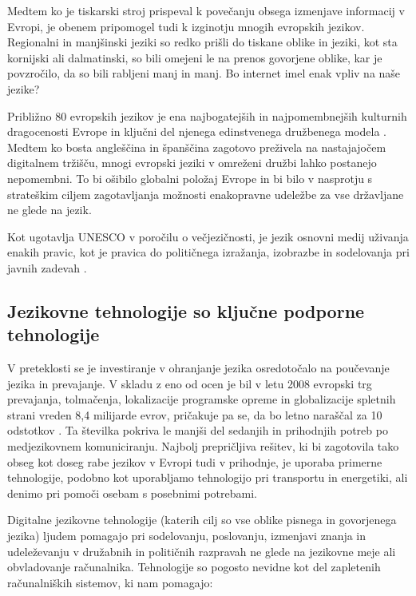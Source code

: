 \begin{multicols}{2}
Medtem ko je tiskarski stroj prispeval k povečanju obsega izmenjave informacij v Evropi, je obenem pripomogel tudi k izginotju mnogih evropskih jezikov. Regionalni in manjšinski jeziki so redko prišli do tiskane oblike in jeziki, kot sta kornijski ali dalmatinski, so bili omejeni le na prenos go\-vorjene oblike, kar je povzročilo, da so bili rab\-ljeni manj in manj. Bo internet imel enak vpliv na naše jezike?


Približno 80 evropskih jezikov je ena naj\-bogatejših in naj\-pomembnejših kulturnih dragocenosti Evrope in ključni del njenega edinstvenega družbenega modela \cite{EC2}.  Medtem ko bosta angleščina in španščina zagotovo preživela na nastajajočem digi\-talnem tržišču, mnogi evropski jeziki v omreženi družbi lahko postanejo nepomembni. To bi ošibilo globalni položaj Evrope in bi bilo v nasprotju s strateškim ciljem zagotav\-ljanja možnosti enakopravne udeležbe za vse držav\-ljane ne glede na jezik.

 Kot ugotav\-lja UNESCO v poročilu o večjezičnosti, je jezik osnovni medij uživanja enakih pravic, kot je pravica do političnega izražanja, izobrazbe in sodelovanja pri javnih zadevah \cite{Unesco1}.

\subsection{Jezikovne tehnologije so ključne podporne tehnologije}

 V preteklosti se je investiranje v ohranjanje jezika osredotočalo na poučevanje jezika in prevajanje. V skladu z eno od ocen je bil v letu 2008 evropski trg prevajanja, tolmačenja, lokalizacije programske opreme in globalizacije spletnih strani vreden 8,4 mili\-jarde evrov, pričakuje pa se, da bo letno naraščal za 10 odstotkov \cite{EC3}.  Ta številka pokriva le manjši del sedanjih in prihodnjih potreb po medjezikovnem komuniciranju. Naj\-bolj prepričljiva rešitev, ki bi zagotovila tako obseg kot doseg rabe jezikov v Evropi tudi v prihodnje, je uporaba primerne tehnologije, podobno kot uporab\-ljamo tehnologijo pri transportu in energetiki, ali denimo pri pomoči osebam s posebnimi potrebami.


Digitalne jezikovne tehnologije (katerih cilj so vse oblike pisnega in go\-vorjenega jezika) ljudem pomagajo pri sodelovanju, poslovanju, izmenjavi znanja in udeleževanju v družabnih in političnih razpravah ne glede na jezikovne meje ali obvladovanje računalnika. Tehnologije so pogosto nevidne kot del zapletenih računalniških sistemov, ki nam pomagajo:


\end{multicols}
